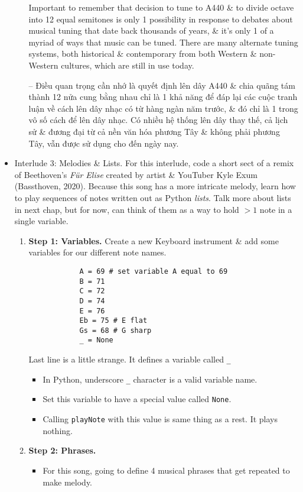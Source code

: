 \documentclass{article}
\begin{document}
\begin{itemize}
\begin{itemize}
		Important to remember that decision to tune to A440 \& to divide octave into 12 equal semitones is only 1 possibility in response to debates about musical tuning that date back thousands of years, \& it's only 1 of a myriad of ways that music can be tuned. There are many alternate tuning systems, both historical \& contemporary from both Western \& non-Western cultures, which are still in use today.
		
		-- Điều quan trọng cần nhớ là quyết định lên dây A440 \& chia quãng tám thành 12 nửa cung bằng nhau chỉ là 1 khả năng để đáp lại các cuộc tranh luận về cách lên dây nhạc có từ hàng ngàn năm trước, \& đó chỉ là 1 trong vô số cách để lên dây nhạc. Có nhiều hệ thống lên dây thay thế, cả lịch sử \& đương đại từ cả nền văn hóa phương Tây \& không phải phương Tây, vẫn được sử dụng cho đến ngày nay.
	\end{itemize}
	\item {\sf Interlude 3: Melodies \& Lists.} For this interlude, code a short sect of a remix of {\sc Beethoven}'s {\it Für Elise} created by artist \& YouTuber {\sc Kyle Exum} (Bassthoven, 2020). Because this song has a more intricate melody, learn how to play sequences of notes written out as Python {\it lists}. Talk more about lists in next chap, but for now, can think of them as a way to hold $> 1$ note in a single variable.
	\begin{enumerate}
		\item {\bf Step 1: Variables.} Create a new Keyboard instrument \& add some variables for our different note names.
		\begin{verbatim}
			A = 69 # set variable A equal to 69
			B = 71
			C = 72
			D = 74
			E = 76
			Eb = 75 # E flat
			Gs = 68 # G sharp
			_ = None			
		\end{verbatim}
		Last line is a little strange. It defines a variable called \verb|_|
		\begin{itemize}
			\item In Python, underscore \verb|_| character is a valid variable name.
			\item Set this variable to have a special value called {\tt None}.
			\item Calling {\tt playNote} with this value is same thing as a rest. It plays nothing.
		\end{itemize}
		\item {\bf Step 2: Phrases.}
		\begin{itemize}
			\item For this song, going to define 4 musical phrases that get repeated to make melody.

\end{itemize}
\end{enumerate}
\end{itemize}
\end{document}
